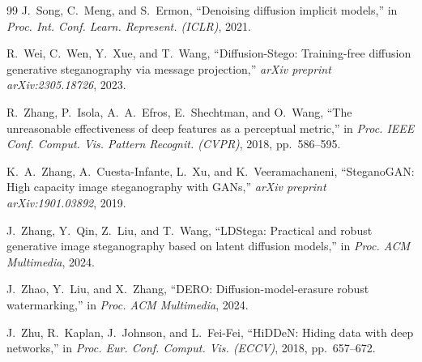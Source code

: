 \documentclass[journal]{IEEEtran}
\begin{document}
\begin{thebibliography}{99}
J.~Song, C.~Meng, and S.~Ermon, ``Denoising diffusion implicit models,'' in \emph{Proc. Int. Conf. Learn. Represent. (ICLR)}, 2021.

R.~Wei, C.~Wen, Y.~Xue, and T.~Wang, ``Diffusion-Stego: Training-free diffusion generative steganography via message projection,'' \emph{arXiv preprint arXiv:2305.18726}, 2023.

R.~Zhang, P.~Isola, A.~A.~Efros, E.~Shechtman, and O.~Wang, ``The unreasonable effectiveness of deep features as a perceptual metric,'' in \emph{Proc. IEEE Conf. Comput. Vis. Pattern Recognit. (CVPR)}, 2018, pp.~586--595.

K.~A.~Zhang, A.~Cuesta-Infante, L.~Xu, and K.~Veeramachaneni, ``SteganoGAN: High capacity image steganography with GANs,'' \emph{arXiv preprint arXiv:1901.03892}, 2019.

J.~Zhang, Y.~Qin, Z.~Liu, and T.~Wang, ``LDStega: Practical and robust generative image steganography based on latent diffusion models,'' in \emph{Proc. ACM Multimedia}, 2024.

J.~Zhao, Y.~Liu, and X.~Zhang, ``DERO: Diffusion-model-erasure robust watermarking,'' in \emph{Proc. ACM Multimedia}, 2024.

J.~Zhu, R.~Kaplan, J.~Johnson, and L.~Fei-Fei, ``HiDDeN: Hiding data with deep networks,'' in \emph{Proc. Eur. Conf. Comput. Vis. (ECCV)}, 2018, pp.~657--672.

\end{thebibliography}
\end{document}
